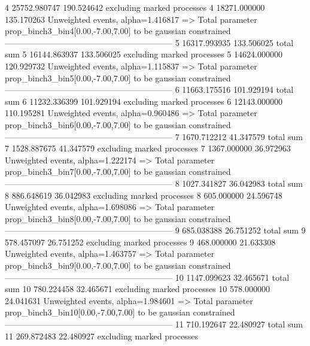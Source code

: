 4          25752.980747    190.524642      excluding marked processes    
4          18271.000000    135.170263      Unweighted events, alpha=1.416817
  => Total parameter prop_binch3_bin4[0.00,-7.00,7.00] to be gaussian constrained
------------------------------------------------------------
5          16317.993935    133.506025      total sum                     
5          16144.863937    133.506025      excluding marked processes    
5          14624.000000    120.929732      Unweighted events, alpha=1.115837
  => Total parameter prop_binch3_bin5[0.00,-7.00,7.00] to be gaussian constrained
------------------------------------------------------------
6          11663.175516    101.929194      total sum                     
6          11232.336399    101.929194      excluding marked processes    
6          12143.000000    110.195281      Unweighted events, alpha=0.960486
  => Total parameter prop_binch3_bin6[0.00,-7.00,7.00] to be gaussian constrained
------------------------------------------------------------
7          1670.712212     41.347579       total sum                     
7          1528.887675     41.347579       excluding marked processes    
7          1367.000000     36.972963       Unweighted events, alpha=1.222174
  => Total parameter prop_binch3_bin7[0.00,-7.00,7.00] to be gaussian constrained
------------------------------------------------------------
8          1027.341827     36.042983       total sum                     
8          886.648619      36.042983       excluding marked processes    
8          605.000000      24.596748       Unweighted events, alpha=1.698086
  => Total parameter prop_binch3_bin8[0.00,-7.00,7.00] to be gaussian constrained
------------------------------------------------------------
9          685.038388      26.751252       total sum                     
9          578.457097      26.751252       excluding marked processes    
9          468.000000      21.633308       Unweighted events, alpha=1.463757
  => Total parameter prop_binch3_bin9[0.00,-7.00,7.00] to be gaussian constrained
------------------------------------------------------------
10         1147.099623     32.465671       total sum                     
10         780.224458      32.465671       excluding marked processes    
10         578.000000      24.041631       Unweighted events, alpha=1.984601
  => Total parameter prop_binch3_bin10[0.00,-7.00,7.00] to be gaussian constrained
------------------------------------------------------------
11         710.192647      22.480927       total sum                     
11         269.872483      22.480927       excluding marked processes    
